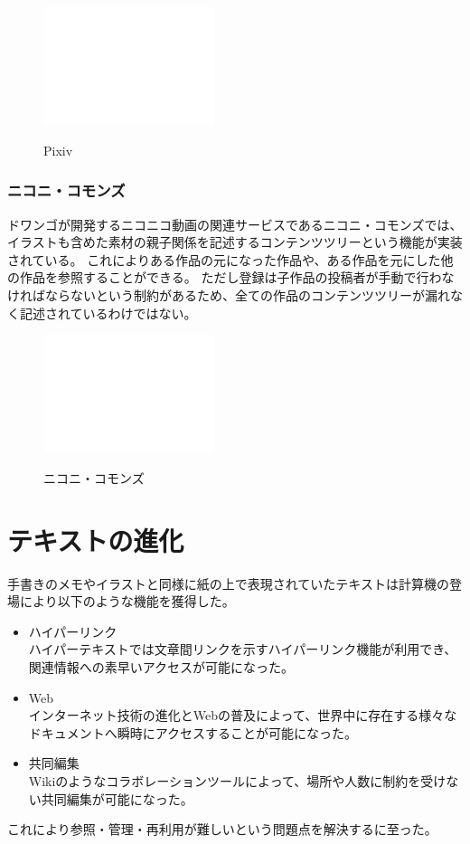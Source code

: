 \begin{figure}[htbp]
    \begin{center}
    {\includegraphics[width=50mm]{images/testimage.png}} \end{center}
    \caption{Pixiv}
\end{figure}


\subsubsection{ニコニ・コモンズ}

ドワンゴが開発するニコニコ動画の関連サービスであるニコニ・コモンズでは、イラストも含めた素材の親子関係を記述するコンテンツツリーという機能が実装されている。
これによりある作品の元になった作品や、ある作品を元にした他の作品を参照することができる。
ただし登録は子作品の投稿者が手動で行わなければならないという制約があるため、全ての作品のコンテンツツリーが漏れなく記述されているわけではない。

\begin{figure}[htbp]
    \begin{center}
    {\includegraphics[width=50mm]{images/testimage.png}} \end{center}
    \caption{ニコニ・コモンズ}
\end{figure}


\section{テキストの進化}
手書きのメモやイラストと同様に紙の上で表現されていたテキストは計算機の登場により以下のような機能を獲得した。
\begin{itemize}
    \item ハイパーリンク\\
    ハイパーテキストでは文章間リンクを示すハイパーリンク機能が利用でき、関連情報への素早いアクセスが可能になった。
    \item Web\\
    インターネット技術の進化とWebの普及によって、世界中に存在する様々なドキュメントへ瞬時にアクセスすることが可能になった。
    \item 共同編集\\
    Wikiのようなコラボレーションツールによって、場所や人数に制約を受けない共同編集が可能になった。
\end{itemize}
これにより参照・管理・再利用が難しいという問題点を解決するに至った。

